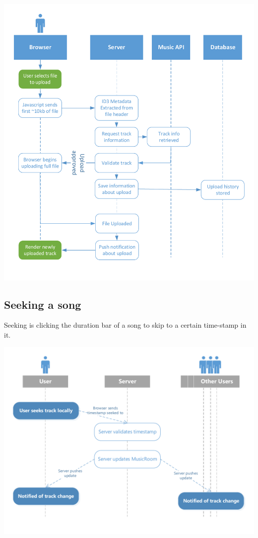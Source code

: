 \documentclass[12pt]{report}
\begin{document}
\includegraphics[scale=1]{uploading.pdf}

\pagebreak

\subsection{Seeking a song}

Seeking is clicking the duration bar of a song to skip to a certain time-stamp in it.

\includegraphics[scale=0.9]{seeking.pdf}
\end{document}
